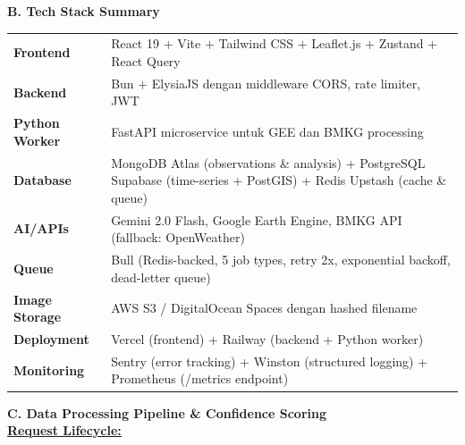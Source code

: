 \documentclass[12pt,a4paper]{article}
\newcommand{\subsectionbox}[1]{%
  \textbf{\large #1}\\[0.3cm]
}
\begin{document}
\subsectionbox{B. Tech Stack Summary}

\begin{tabularx}{\textwidth}{|l|X|}
  \hline
  \textbf{Frontend} & React 19 + Vite + Tailwind CSS + Leaflet.js + Zustand + React Query \\[0.2cm]
  \textbf{Backend} & Bun + ElysiaJS dengan middleware CORS, rate limiter, JWT \\[0.2cm]
  \textbf{Python Worker} & FastAPI microservice untuk GEE dan BMKG processing \\[0.2cm]
  \textbf{Database} & MongoDB Atlas (observations \& analysis) + PostgreSQL Supabase (time-series + PostGIS) + Redis Upstash (cache \& queue) \\[0.2cm]
  \textbf{AI/APIs} & Gemini 2.0 Flash, Google Earth Engine, BMKG API (fallback: OpenWeather) \\[0.2cm]
  \textbf{Queue} & Bull (Redis-backed, 5 job types, retry 2x, exponential backoff, dead-letter queue) \\[0.2cm]
  \textbf{Image Storage} & AWS S3 / DigitalOcean Spaces dengan hashed filename \\[0.2cm]
  \textbf{Deployment} & Vercel (frontend) + Railway (backend + Python worker) \\[0.2cm]
  \textbf{Monitoring} & Sentry (error tracking) + Winston (structured logging) + Prometheus (/metrics endpoint) \\
  \hline
\end{tabularx}

\vspace{0.5cm}

\subsectionbox{C. Data Processing Pipeline \& Confidence Scoring}

\textbf{\underline{Request Lifecycle:}}
\end{document}
